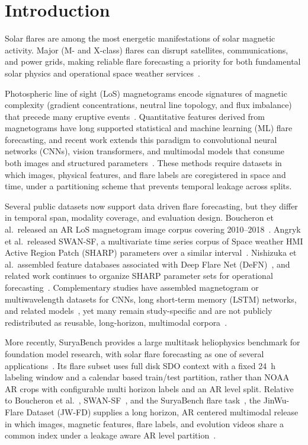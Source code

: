 \documentclass[universe,article,submit,moreauthors]{Definitions/mdpi}
\begin{document}
\section{Introduction}
\label{sec:intro}

Solar flares are among the most energetic manifestations of solar magnetic activity. Major (M- and X-class) flares can disrupt satellites, communications, and power grids, making reliable flare forecasting a priority for both fundamental solar physics and operational space weather services~\cite{Shao2025review,Toriumi2019,Leka2019}.

Photospheric line of sight (LoS) magnetograms encode signatures of magnetic complexity (gradient
concentrations, neutral line topology, and flux imbalance) that precede many eruptive events~\cite{Boucheron2015,Bobra2014}. Quantitative features derived from magnetograms have long supported statistical and machine learning (ML) flare forecasting, and recent work extends this paradigm to convolutional neural networks (CNNs), vision transformers, and multimodal models that consume both images and structured parameters~\cite{Shao2025jwflare,Shao2026jwvl}. These methods require datasets in which images, physical features, and flare labels are coregistered in space and time, under a partitioning scheme that prevents temporal leakage across splits.

Several public datasets now support data driven flare forecasting, but they differ in temporal span, modality coverage, and evaluation design. Boucheron et al.\ released an AR LoS magnetogram image corpus covering 2010--2018~\cite{Boucheron2023}. Angryk et al.\ released SWAN-SF, a multivariate time series corpus of Space weather HMI Active Region Patch (SHARP) parameters over a similar interval~\cite{Angryk2020,Bobra2014sharp}. Nishizuka et al.\ assembled feature databases associated with Deep Flare Net (DeFN)~\cite{Nishizuka2017,Nishizuka2018}, and related work continues to organize SHARP parameter sets for operational forecasting~\cite{Abduallah2023,Florios2018}. Complementary studies have assembled magnetogram or multiwavelength datasets for CNNs, long short-term memory (LSTM) networks, and related models~\cite{Huang2018,Li2020,Sun2022,Jonas2018}, yet many remain study-specific and are not publicly redistributed as reusable, long-horizon, multimodal corpora~\cite{Shao2025review,Bloomfield2012,Barnes2016}.

More recently, SuryaBench provides a large multitask heliophysics benchmark for foundation model research, with solar flare forecasting as one of several applications~\cite{Roy2026}. Its flare subset uses full disk SDO context with a fixed 24~h labeling window and a calendar based train/test partition, rather than NOAA AR crops with configurable multi horizon labels and an AR level split. Relative to Boucheron et al.~\cite{Boucheron2023}, SWAN-SF~\cite{Angryk2020}, and the SuryaBench flare task~\cite{Roy2026}, the JinWu-Flare Dataset (JW-FD) supplies a long horizon, AR centered multimodal release in which images, magnetic features, flare labels, and evolution videos share a common index under a leakage aware AR level partition~\cite{Leka2019}.
\end{document}
